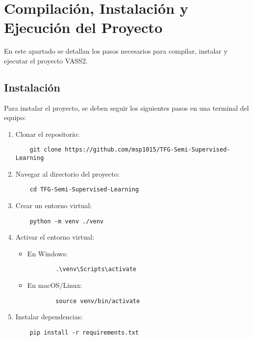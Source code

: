 \section{Compilación, Instalación y Ejecución del Proyecto}

En este apartado se detallan los pasos necesarios para compilar, instalar y ejecutar el proyecto VASS2.

\subsection{Instalación}

Para instalar el proyecto, se deben seguir los siguientes pasos en una terminal del equipo:

\begin{enumerate}
    \item Clonar el repositorio:
    \begin{verbatim}
    git clone https://github.com/msp1015/TFG-Semi-Supervised-Learning
    \end{verbatim}

    \item Navegar al directorio del proyecto:
    \begin{verbatim}
    cd TFG-Semi-Supervised-Learning
    \end{verbatim}

    \item Crear un entorno virtual:
    \begin{verbatim}
    python -m venv ./venv
    \end{verbatim}

    \item Activar el entorno virtual:
    \begin{itemize}
        \item En Windows:
        \begin{verbatim}
        .\venv\Scripts\activate
        \end{verbatim}

        \item En macOS/Linux:
        \begin{verbatim}
        source venv/bin/activate
        \end{verbatim}
    \end{itemize}

    \item Instalar dependencias:
    \begin{verbatim}
    pip install -r requirements.txt
    \end{verbatim}


\end{enumerate}
